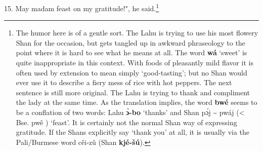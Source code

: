 15. May madam feast on my gratitude!", he said.\footnote{The humor here is of a gentle sort. The Lahu is trying to use his most flowery Shan for the occasion, but gets tangled up in awkward phraseology to the point where it is hard to see what he means at all. The word \textbf{wá} `sweet' is quite inappropriate in this context. With foods of pleasantly mild flavor it is often used by extension to mean simply `good-tasting'; but no Shan would ever use it to describe a fiery mess of rice with hot peppers. The next sentence is still more original. The Lahu is trying to thank and compliment the lady at the same time. As the translation implies, the word \textbf{bwé} seems to be a conflation of two words: Lahu \textbf{ɔ̀-bo} `thanks' and Shan pɔ́j \textasciitilde{} pwáj (< Bse. pwê ) `feast'. It is certainly not the normal Shan way of expressing gratitude. If the Shans explicitly say `thank you' at all, it is usually via the Pali/Burmese word cêi-zû (Shan \textbf{kjé-šú}).}

